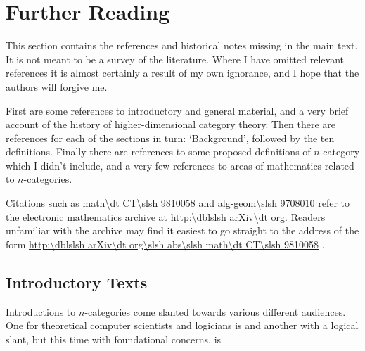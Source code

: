 
\section*{Further Reading}	\label{p:biblio}


This section contains the references and historical notes missing in the
main text.  It is not meant to be a survey of the literature.  Where I have
omitted relevant references it is almost certainly a result of my own
ignorance, and I hope that the authors will forgive me.

First are some references to introductory and general material, and a very
brief account of the history of higher-dimensional category theory.  Then
there are references for each of the sections in turn: `Background',
followed by the ten definitions.  Finally there are references to some
proposed definitions of $n$-category which I didn't include, and a very few
references to areas of mathematics related to $n$-categories. 

Citations such as \url{math\dt CT\slsh 9810058} and \url{alg-geom\slsh
9708010} refer to the electronic mathematics archive at
\url{http:\dblslsh arXiv\dt org}.
Readers unfamiliar with the archive may find it easiest to go straight to the
address of the form \url{http:\dblslsh arXiv\dt org\slsh abs\slsh math\dt
CT\slsh 9810058} .


\subsection*{Introductory Texts}

Introductions to $n$-categories come slanted towards various different
audiences.  One for theoretical computer scientists and logicians is 
% 
%
% 
and another with a logical slant, but this time with foundational concerns,
is 
% 
%
%

